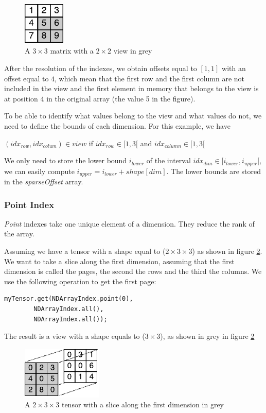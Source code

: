 \begin{figure}[!h]
	\centering
	\includegraphics[width=0.8in]{images/viewIndexOffset.pdf}
	\caption{A $3\times 3$ matrix with a $2\times 2$ view in grey}
	\label{fig:viewOffsetDup}
\end{figure}

After the resolution of the indexes, we obtain offsets equal to $[1, 1]$ with an offset equal to $4$, which mean that the first row and the first column are not included in the view and the first element in memory that belongs to the view is at position $4$ in the original array (the value 5 in the figure).

To be able to identify what values belong to the view and what values do not, we need to define the bounds of each dimension. For this example, we have

$(idx_{row}, idx_{colum}) \in view $  if  $idx_{row} \in [1, 3[$ and $idx_{column} \in [1, 3[$

We only need to store the lower bound $i_{lower}$ of the interval $idx_{dim} \in [i_{lower}, i_{upper}[$, we can easily compute $i_{upper} = i_{lower}+shape[dim]$.
The lower bounds are stored in the \textit{sparseOffset} array.

\subsubsection{Point Index}
\textit{Point} indexes take one unique element of a dimension. They reduce the rank of the array.

Assuming we have a tensor with a shape equal to ($2\times 3\times 3$) as shown in figure \ref{fig:pointTensor}. We want to take a slice along the first dimension, assuming that the first dimension is called the pages, the second the rows and the third the columns. We use the following operation to get the first page:
\begin{lstlisting}[style=nonumbers]
	myTensor.get(NDArrayIndex.point(0),
		NDArrayIndex.all(),
		NDArrayIndex.all());
\end{lstlisting} 

The result is a view with a shape equals to ($3\times 3$), as shown in grey in figure \ref{fig:pointTensor}

\begin{figure}[!h]
	\centering
	\includegraphics[width=1.5in]{images/tensorsHiglighted.pdf}
	\caption{A $2\times 3\times 3$ tensor with a slice along the first dimension in grey}
	\label{fig:pointTensor}
\end{figure}

